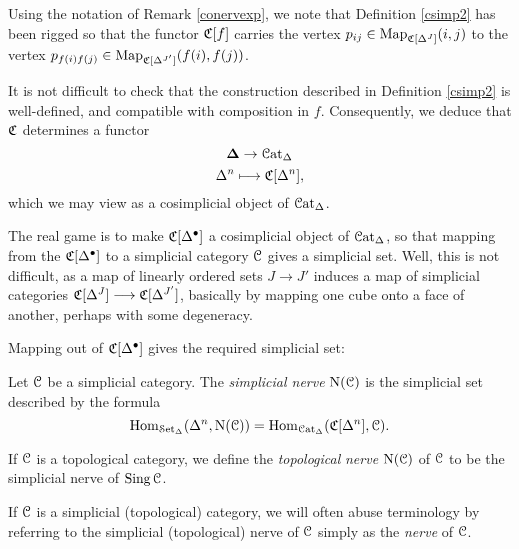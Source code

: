 \begin{1.1.5 inf-cats vs simplicial cats}
\begin{remark}
Using the notation of Remark \ref{conervexp}, we note that Definition \ref{csimp2} has been rigged so that the functor $\operatorname{\mathfrak{C}}[f]$ carries the vertex $p_{ij}
\in \operatorname{{Map}}_{\operatorname{\mathfrak{C}}[ \Delta^J ]}(i,j)$ to the vertex
$p_{f(i) f(j)} \in \operatorname{{Map}}_{\operatorname{\mathfrak{C}}[\Delta^{J'}]}(f(i), f(j))$.
\end{remark}

It is not difficult to check that the construction described in
Definition \ref{csimp2} is well-defined, and compatible with composition in $f$.
Consequently, we deduce that $\operatorname{\mathfrak{C}}$ determines a functor
$$ \operatorname{{\bf \Delta}} \rightarrow \operatorname{\mathcal{C}at_{\Delta}}$$
$$ \Delta^n \longmapsto \operatorname{\mathfrak{C}}[ \Delta^n ],$$
which we may view as a cosimplicial object of $\operatorname{\mathcal{C}at_{\Delta}}$.
\begin{shaded}
The real game is to make $\operatorname{\mathfrak{C}}[\Delta^\bullet]$ a cosimplicial object of $\operatorname{\mathcal{C}at_{\Delta}}$, so that mapping from the $\operatorname{\mathfrak{C}}[\Delta^\bullet]$ to a simplicial category $\operatorname{\mathcal{C}}$ gives a simplicial set. Well, this is not difficult, as a map of linearly ordered sets $J\to J'$ induces a map of simplicial categories $\operatorname{\mathfrak{C}}[\Delta^J]\longrightarrow \operatorname{\mathfrak{C}}[\Delta^{J'}]$, basically by mapping one cube onto a face of another, perhaps with some degeneracy.

Mapping out of $\operatorname{\mathfrak{C}}[\Delta^\bullet]$ gives the required simplicial set:
\end{shaded}

\begin{definition}\label{topnerve}
Let $\operatorname{\mathcal{C}}$ be a simplicial category. The {\it simplicial nerve}
$\operatorname{N}(\operatorname{\mathcal{C}})$ is the simplicial set described by the
formula
$$ \operatorname{Hom}_{ \operatorname{\mathcal{S}et_{\Delta}}}( \Delta^n, \operatorname{N}(\operatorname{\mathcal{C}})) =
\operatorname{Hom}_{\operatorname{\mathcal{C}at_{\Delta}}}( \operatorname{\mathfrak{C}}[ \Delta^n ], \operatorname{\mathcal{C}}).$$ 

If $\operatorname{\mathcal{C}}$ is a topological category, we define the {\it
topological} {\it nerve} $\operatorname{N}(\operatorname{\mathcal{C}})$ of $\operatorname{\mathcal{C}}$ to be the
simplicial nerve of $\operatorname{Sing} \operatorname{\mathcal{C}}$.
\end{definition}

\begin{remark}
If $\operatorname{\mathcal{C}}$ is a simplicial (topological) category, we will often abuse terminology by referring to the 
simplicial (topological) nerve of $\operatorname{\mathcal{C}}$ simply as the {\em nerve} of $\operatorname{\mathcal{C}}$. 
\end{remark}


\end{1.1.5 inf-cats vs simplicial cats}
